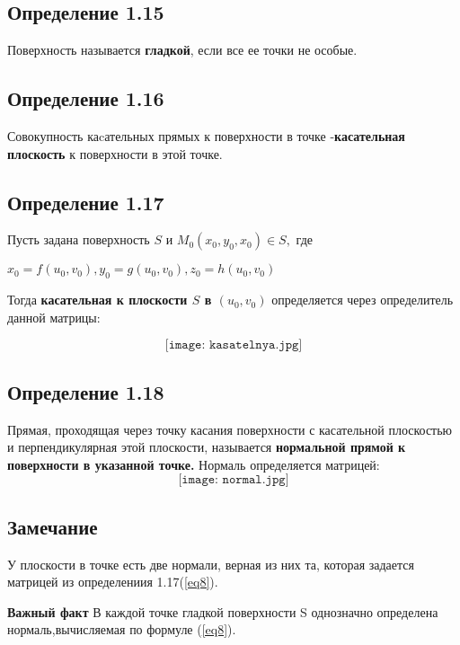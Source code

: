 \documentclass[12pt, english]{article}
\begin{document}
\subsection*{Определение 1.15 }

Поверхность называется \textbf{гладкой}, если все ее точки не особые.



\subsection*{Определение 1.16 }
Совокупность каcательных прямых к поверхности в точке -\textbf{касательная плоскость} к поверхности в этой точке.

\subsection*{Определение 1.17}
	
	Пусть задана поверхность $S$ и $M_0(x_0 , y_0 , x_0) \in S,  
$ где

$
x_0 = f(u_0 , v_0) , y_0 = g(u_0 , v_0) , 
z_0 = h(u_0 , v_0)$

Тогда \textbf{касательная к плоскости $S$ в $(u_0 , v_0)$} определяется через определитель данной матрицы:
\begin{center}
\begin{equation}
\texttt{[image: kasatelnya.jpg]}\label{eq7}
\end{equation}
\end{center}
\subsection*{Определение 1.18}
	Прямая, проходящая через точку касания поверхности с касательной плоскостью и перпендикулярная этой плоскости, называется \textbf{нормальной прямой к поверхности в указанной точке.}
	Нормаль определяется матрицей:
\begin{equation}
	\texttt{[image: normal.jpg]}\label{eq8}
\end{equation}
\subsection*{Замечание}
	У плоскости в точке есть две нормали, верная из них та, которая задается матрицей из определениия 1.17(\ref{eq8}).	
	
	
\textbf{Важный факт}
	В каждой точке гладкой поверхности S однозначно определена нормаль,вычисляемая по формуле (\ref{eq8}).
	
\end{document}
